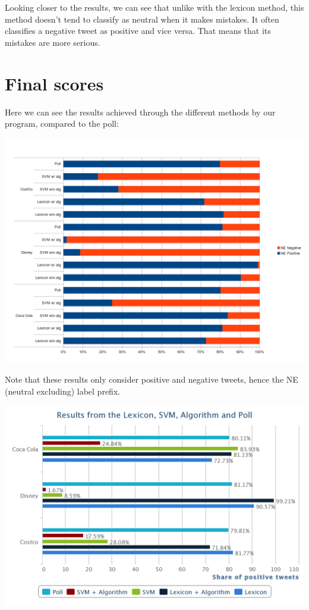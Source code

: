 \documentclass[a4paper,12pt]{report}
\begin{document}
Looking closer to the results, we can see that unlike with the lexicon method, this method doesn't tend to classify as neutral when it makes mistakes.
It often classifies a negative tweet as positive and vice versa.
That means that its mistakes are more serious.

\section{Final scores}
Here we can see the results achieved through the different methods by our program, compared to the poll:

\centerline{\includegraphics[scale=0.6]{../img/full1.png}}

Note that these results only consider positive and negative tweets, hence the NE (neutral excluding) label prefix.

\centerline{\includegraphics[scale=0.5]{../img/chart.png}}
\end{document}

